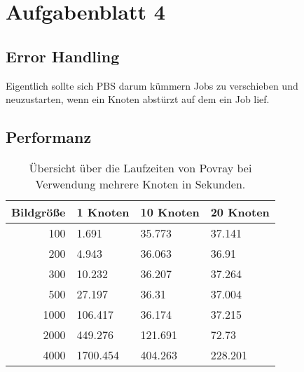 \section{Aufgabenblatt 4}

\subsection{Error Handling}
	Eigentlich sollte sich PBS darum kümmern Jobs zu verschieben und 
	neuzustarten, wenn ein Knoten abstürzt auf dem ein Job lief.


\subsection{Performanz}

		\begin{table}[h!]
		\begin{center}
		\begin{tabular}{r l l l} 
			\toprule
			Bildgröße	&	1 Knoten		&	10 Knoten	&	20 Knoten	\\
			\midrule

			100	&	1.691		&	35.773	&	37.141	\\
			200	&	4.943		&	36.063	&	36.91	\\
			300	&	10.232	&	36.207	&	37.264	\\
			500	&	27.197	&	36.31		&	37.004	\\
			1000	&	106.417	&	36.174	&	37.215	\\
			2000	&	449.276	&	121.691	&	72.73	\\
			4000	&	1700.454	&	404.263	&	228.201	\\
			\bottomrule

		\end{tabular}
		\caption{Übersicht über die Laufzeiten von Povray bei Verwendung mehrere Knoten in Sekunden.}
		\label{tab:povrayperformance}
		\end{center}
		\end{table}

